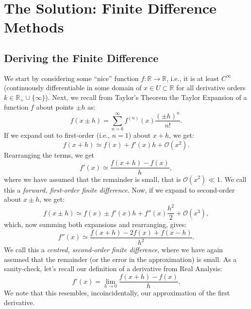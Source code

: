 \documentclass[11pt]{article}
\begin{document}
\section*{The Solution: Finite Difference Methods}

\subsection*{Deriving the Finite Difference}
We start by considering some ``nice'' function $f: \mathbb{R} \to \mathbb{R}$, i.e., it is at least  $C^\infty$ (continuously differentiable in some domain of $x \in U \subset \mathbb{R}$ for all derivative orders $k \in \mathbb{R}_+ \cup \{\infty\}$).
Next, we recall from Taylor's Theorem the Taylor Expansion of a function $f$ about points $\pm h$ as:
\begin{equation}
	f\left(x\pm h\right) = \sum_{n=0}^\infty f^{\left(n\right)}\left(x\right)\frac{\left(\pm h\right)^n}{n!}.
	\label{eq:taylor}
\end{equation}
If we expand out to first-order (i.e., $n=1$) about $x+h$, we get:
\begin{equation}
	f\left(x + h\right) \simeq f\left(x\right) + f'\left(x\right)h + \mathcal{O}\left(x^2\right).
\end{equation}
Rearranging the terms, we get
\begin{equation}
	f'\left(x\right) \simeq \frac{f\left(x+h\right) - f\left(x\right)}{h},
	\label{eq:first}
\end{equation}
where we have assumed that the remainder is small, that is $\mathcal{O}\left(x^2\right) \ll 1$.
We call this a \emph{forward, first-order finite difference}.
Now, if we expand to second-order about $x \pm h$, we get:
\begin{equation}
	f\left(x\pm h\right) \simeq f\left(x\right) \pm f'\left(x\right)h + f''\left(x\right) \frac{h^2}{2} + \mathcal{O}\left(x^3\right),
\end{equation}
which, now summing both expansions and rearranging, gives:
\begin{equation}
	f''\left(x\right) \simeq \frac{f\left(x + h \right) - 2f\left(x\right) + f\left(x - h\right)}{h^2}.
	\label{eq:second}
\end{equation}
We call this a \emph {centred, second-order finite difference}, where we have again assumed that the remainder (or the error in the approximation) is small. 
As a sanity-check, let's recall our definition of a derivative from Real Analysis:
\begin{equation}
	f'\left(x\right) = \lim_{h\to 0} \frac{f\left(x+h\right) - f\left(x\right)}{h}.
\end{equation}
We note that this resembles, incoincidentally, our approximation of the first derivative.
\end{document}
